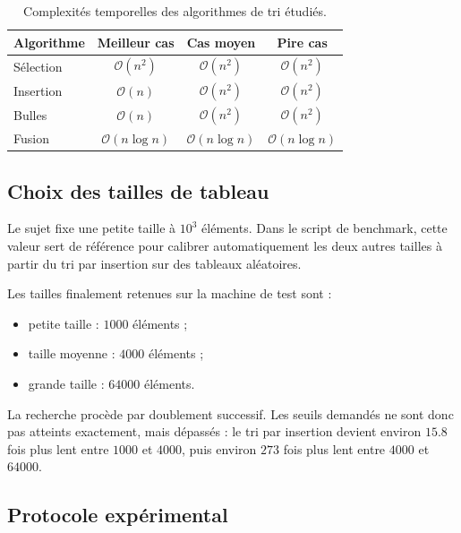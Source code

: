 \begin{table}[H]
	\centering
	\begin{tabular}{lccc}
		\toprule
		Algorithme    & Meilleur cas              & Cas moyen                 & Pire cas                  \\
		\midrule
		S\'{e}lection & \(\mathcal{O}(n^2)\)      & \(\mathcal{O}(n^2)\)      & \(\mathcal{O}(n^2)\)      \\
		Insertion     & \(\mathcal{O}(n)\)        & \(\mathcal{O}(n^2)\)      & \(\mathcal{O}(n^2)\)      \\
		Bulles        & \(\mathcal{O}(n)\)        & \(\mathcal{O}(n^2)\)      & \(\mathcal{O}(n^2)\)      \\
		Fusion        & \(\mathcal{O}(n \log n)\) & \(\mathcal{O}(n \log n)\) & \(\mathcal{O}(n \log n)\) \\
		\bottomrule
	\end{tabular}
	\caption{Complexit\'{e}s temporelles des algorithmes de tri \'{e}tudi\'{e}s.}\label{tab:tp3-complexites}
\end{table}

\subsection{Choix des tailles de tableau}\label{subsec:tp3-tailles}

Le sujet fixe une petite taille \`{a} \(10^3\) \'{e}l\'{e}ments.
Dans le script de
benchmark, cette valeur sert de r\'{e}f\'{e}rence pour calibrer automatiquement les
deux autres tailles \`{a} partir du tri par insertion sur des tableaux al\'{e}atoires.

Les tailles finalement retenues sur la machine de test sont :

\begin{itemize}
	\item petite taille : \(1000\) \'{e}l\'{e}ments ;
	\item taille moyenne : \(4000\) \'{e}l\'{e}ments ;
	\item grande taille : \(64000\) \'{e}l\'{e}ments.
\end{itemize}

La recherche proc\`{e}de par doublement successif.
Les seuils demand\'{e}s ne sont
donc pas atteints exactement, mais d\'{e}pass\'{e}s : le tri par insertion devient
environ \(15.8\) fois plus lent entre \(1000\) et \(4000\), puis environ
\(273\) fois plus lent entre \(4000\) et \(64000\).

\subsection{Protocole exp\'{e}rimental}\label{subsec:tp3-protocole}

